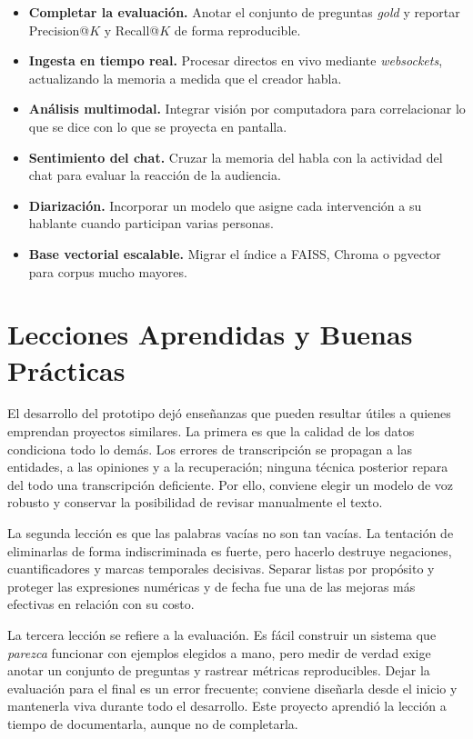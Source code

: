 \documentclass[12pt,a4paper]{article}
\begin{document}
\begin{itemize}
  \item \textbf{Completar la evaluación.} Anotar el conjunto de preguntas \emph{gold} y reportar Precision@$K$ y Recall@$K$ de forma reproducible.
  \item \textbf{Ingesta en tiempo real.} Procesar directos en vivo mediante \emph{websockets}, actualizando la memoria a medida que el creador habla.
  \item \textbf{Análisis multimodal.} Integrar visión por computadora para correlacionar lo que se dice con lo que se proyecta en pantalla.
  \item \textbf{Sentimiento del chat.} Cruzar la memoria del habla con la actividad del chat para evaluar la reacción de la audiencia.
  \item \textbf{Diarización.} Incorporar un modelo que asigne cada intervención a su hablante cuando participan varias personas.
  \item \textbf{Base vectorial escalable.} Migrar el índice a FAISS, Chroma o pgvector para corpus mucho mayores.
\end{itemize}


\section{Lecciones Aprendidas y Buenas Prácticas}
\label{sec:lecciones}

El desarrollo del prototipo dejó enseñanzas que pueden resultar útiles a quienes emprendan proyectos similares. La primera es que la calidad de los datos condiciona todo lo demás. Los errores de transcripción se propagan a las entidades, a las opiniones y a la recuperación; ninguna técnica posterior repara del todo una transcripción deficiente. Por ello, conviene elegir un modelo de voz robusto y conservar la posibilidad de revisar manualmente el texto.

La segunda lección es que las palabras vacías no son tan vacías. La tentación de eliminarlas de forma indiscriminada es fuerte, pero hacerlo destruye negaciones, cuantificadores y marcas temporales decisivas. Separar listas por propósito y proteger las expresiones numéricas y de fecha fue una de las mejoras más efectivas en relación con su costo.

La tercera lección se refiere a la evaluación. Es fácil construir un sistema que \emph{parezca} funcionar con ejemplos elegidos a mano, pero medir de verdad exige anotar un conjunto de preguntas y rastrear métricas reproducibles. Dejar la evaluación para el final es un error frecuente; conviene diseñarla desde el inicio y mantenerla viva durante todo el desarrollo. Este proyecto aprendió la lección a tiempo de documentarla, aunque no de completarla.
\end{document}
